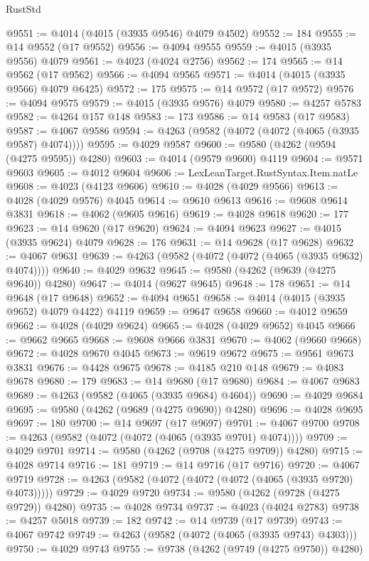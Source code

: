 \begin{lexlean}{RustStd}
\begin{coremodule}
@9551 := @4014 (@4015 (@3935 @9546) @4079 @4502)
@9552 := 184
@9555 := @14 @9552 (@17 @9552)
@9556 := @4094 @9555
@9559 := @4015 (@3935 @9556) @4079
@9561 := @4023 (@4024 @2756)
@9562 := 174
@9565 := @14 @9562 (@17 @9562)
@9566 := @4094 @9565
@9571 := @4014 (@4015 (@3935 @9566) @4079 @6425)
@9572 := 175
@9575 := @14 @9572 (@17 @9572)
@9576 := @4094 @9575
@9579 := @4015 (@3935 @9576) @4079
@9580 := @4257 @5783
@9582 := @4264 @157 @148
@9583 := 173
@9586 := @14 @9583 (@17 @9583)
@9587 := @4067 @9586
@9594 := @4263 (@9582 (@4072 (@4072 (@4065 (@3935 @9587) @4074))))
@9595 := @4029 @9587
@9600 := @9580 (@4262 (@9594 (@4275 @9595)) @4280)
@9603 := @4014 (@9579 @9600) @4119
@9604 := @9571 @9603
@9605 := @4012 @9604
@9606 := LexLeanTarget.RustSyntax.Item.natLe
@9608 := @4023 (@4123 @9606)
@9610 := @4028 (@4029 @9566)
@9613 := @4028 (@4029 @9576) @4045
@9614 := @9610 @9613
@9616 := @9608 @9614 @3831
@9618 := @4062 (@9605 @9616)
@9619 := @4028 @9618
@9620 := 177
@9623 := @14 @9620 (@17 @9620)
@9624 := @4094 @9623
@9627 := @4015 (@3935 @9624) @4079
@9628 := 176
@9631 := @14 @9628 (@17 @9628)
@9632 := @4067 @9631
@9639 := @4263 (@9582 (@4072 (@4072 (@4065 (@3935 @9632) @4074))))
@9640 := @4029 @9632
@9645 := @9580 (@4262 (@9639 (@4275 @9640)) @4280)
@9647 := @4014 (@9627 @9645)
@9648 := 178
@9651 := @14 @9648 (@17 @9648)
@9652 := @4094 @9651
@9658 := @4014 (@4015 (@3935 @9652) @4079 @4422) @4119
@9659 := @9647 @9658
@9660 := @4012 @9659
@9662 := @4028 (@4029 @9624)
@9665 := @4028 (@4029 @9652) @4045
@9666 := @9662 @9665
@9668 := @9608 @9666 @3831
@9670 := @4062 (@9660 @9668)
@9672 := @4028 @9670 @4045
@9673 := @9619 @9672
@9675 := @9561 @9673 @3831
@9676 := @4428 @9675
@9678 := @4185 @210 @148
@9679 := @4083 @9678
@9680 := 179
@9683 := @14 @9680 (@17 @9680)
@9684 := @4067 @9683
@9689 := @4263 (@9582 (@4065 (@3935 @9684) @4604))
@9690 := @4029 @9684
@9695 := @9580 (@4262 (@9689 (@4275 @9690)) @4280)
@9696 := @4028 @9695
@9697 := 180
@9700 := @14 @9697 (@17 @9697)
@9701 := @4067 @9700
@9708 := @4263 (@9582 (@4072 (@4072 (@4065 (@3935 @9701) @4074))))
@9709 := @4029 @9701
@9714 := @9580 (@4262 (@9708 (@4275 @9709)) @4280)
@9715 := @4028 @9714
@9716 := 181
@9719 := @14 @9716 (@17 @9716)
@9720 := @4067 @9719
@9728 := @4263 (@9582 (@4072 (@4072 (@4072 (@4065 (@3935 @9720) @4073)))))
@9729 := @4029 @9720
@9734 := @9580 (@4262 (@9728 (@4275 @9729)) @4280)
@9735 := @4028 @9734
@9737 := @4023 (@4024 @2783)
@9738 := @4257 @5018
@9739 := 182
@9742 := @14 @9739 (@17 @9739)
@9743 := @4067 @9742
@9749 := @4263 (@9582 (@4072 (@4065 (@3935 @9743) @4303)))
@9750 := @4029 @9743
@9755 := @9738 (@4262 (@9749 (@4275 @9750)) @4280)

\end{coremodule}
\end{lexlean}
